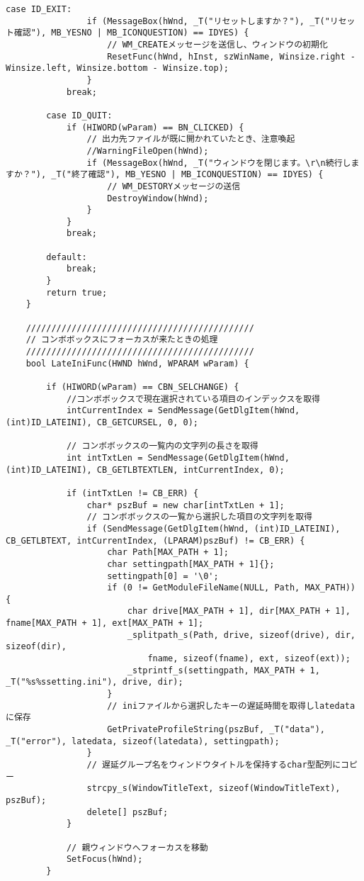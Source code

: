 \begin{lstlisting}[caption=main.cpp]
		case ID_EXIT:
				if (MessageBox(hWnd, _T("リセットしますか？"), _T("リセット確認"), MB_YESNO | MB_ICONQUESTION) == IDYES) {
					// WM_CREATEメッセージを送信し、ウィンドウの初期化
					ResetFunc(hWnd, hInst, szWinName, Winsize.right - Winsize.left, Winsize.bottom - Winsize.top);
				}
			break;
	
		case ID_QUIT:
			if (HIWORD(wParam) == BN_CLICKED) {
				// 出力先ファイルが既に開かれていたとき、注意喚起
				//WarningFileOpen(hWnd);
				if (MessageBox(hWnd, _T("ウィンドウを閉じます。\r\n続行しますか？"), _T("終了確認"), MB_YESNO | MB_ICONQUESTION) == IDYES) {
					// WM_DESTORYメッセージの送信
					DestroyWindow(hWnd);
				}
			}
			break;
		
		default:
			break;
		}
		return true;
	}
	
	/////////////////////////////////////////////
	// コンボボックスにフォーカスが来たときの処理
	/////////////////////////////////////////////
	bool LateIniFunc(HWND hWnd, WPARAM wParam) {
	
		if (HIWORD(wParam) == CBN_SELCHANGE) {
			//コンボボックスで現在選択されている項目のインデックスを取得
			intCurrentIndex = SendMessage(GetDlgItem(hWnd, (int)ID_LATEINI), CB_GETCURSEL, 0, 0);
			
			// コンボボックスの一覧内の文字列の長さを取得
			int intTxtLen = SendMessage(GetDlgItem(hWnd, (int)ID_LATEINI), CB_GETLBTEXTLEN, intCurrentIndex, 0);
	
			if (intTxtLen != CB_ERR) {
				char* pszBuf = new char[intTxtLen + 1];
				// コンボボックスの一覧から選択した項目の文字列を取得
				if (SendMessage(GetDlgItem(hWnd, (int)ID_LATEINI), CB_GETLBTEXT, intCurrentIndex, (LPARAM)pszBuf) != CB_ERR) {
					char Path[MAX_PATH + 1];
					char settingpath[MAX_PATH + 1]{};
					settingpath[0] = '\0';
					if (0 != GetModuleFileName(NULL, Path, MAX_PATH)) {
						char drive[MAX_PATH + 1], dir[MAX_PATH + 1], fname[MAX_PATH + 1], ext[MAX_PATH + 1];
						_splitpath_s(Path, drive, sizeof(drive), dir, sizeof(dir),
							fname, sizeof(fname), ext, sizeof(ext));
						_stprintf_s(settingpath, MAX_PATH + 1, _T("%s%ssetting.ini"), drive, dir);
					}
					// iniファイルから選択したキーの遅延時間を取得しlatedataに保存
					GetPrivateProfileString(pszBuf, _T("data"), _T("error"), latedata, sizeof(latedata), settingpath);
				}
				// 遅延グループ名をウィンドウタイトルを保持するchar型配列にコピー
				strcpy_s(WindowTitleText, sizeof(WindowTitleText), pszBuf);
				delete[] pszBuf;
			}
	
			// 親ウィンドウへフォーカスを移動
			SetFocus(hWnd);
		}
		

\end{lstlisting}
